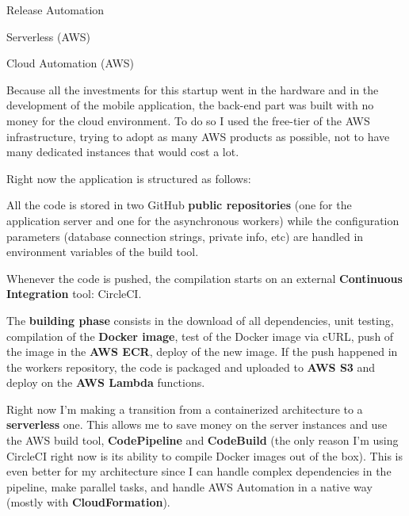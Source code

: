 \begin{minipage}[t]{0.33\textwidth} %


\begin{tightitemize}
\item Release Automation
\item Serverless (AWS)
\item Cloud Automation (AWS)
\end{tightitemize}

\end{minipage} %
\hfill
\begin{minipage}[t]{0.66\textwidth} %

\vspace{\topsep} %

Because all the investments for this startup went in the hardware and in the development of the mobile application, the back-end part was built with no money for the cloud environment. To do so I used the free-tier of the AWS infrastructure, trying to adopt as many AWS products as possible, not to have many dedicated instances that would cost a lot.

Right now the application is structured as follows:

\begin{tightitemize}
\item All the code is stored in two GitHub \textbf{public repositories} (one for the application server and one for the asynchronous workers) while the configuration parameters (database connection strings, private info, etc) are handled in environment variables of the build tool.
\item Whenever the code is pushed, the compilation starts on an external \textbf{Continuous Integration} tool: CircleCI.
\item The \textbf{building phase} consists in the download of all dependencies, unit testing, compilation of the \textbf{Docker image}, test of the Docker image via cURL, push of the image in the \textbf{AWS ECR}, deploy of the new image. If the push happened in the workers repository, the code is packaged and uploaded to \textbf{AWS S3} and deploy on the \textbf{AWS Lambda} functions.
\end{tightitemize}

Right now I'm making a transition from a containerized architecture to a \textbf{serverless} one. This allows me to save money on the server instances and use the AWS build tool, \textbf{CodePipeline} and \textbf{CodeBuild} (the only reason I'm using CircleCI right now is its ability to compile Docker images out of the box). This is even better for my architecture since I can handle complex dependencies in the pipeline, make parallel tasks, and handle AWS Automation in a native way (mostly with \textbf{CloudFormation}).

\end{minipage} %

